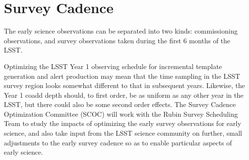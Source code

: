 \section{Survey Cadence}


The early science observations can be separated into two kinds: commissioning observations, and survey observations taken during the first 6 months of the LSST.

Optimizing the LSST Year 1 observing schedule for incremental template generation and alert production may mean that the time sampling in the LSST survey region looks somewhat different to that in subsequent years.
Likewise, the Year 1 coadd depth should, to first order, be as uniform as any other year in the LSST, but there could also be some second order effects.
The Survey Cadence Optimization Committee (SCOC) will work with the Rubin Survey Scheduling Team to study the impacts of optimizing the early survey observations for early science, and also take input from the LSST science community on further, small adjustments to the early survey cadence so as to enable particular aspects of early science.
